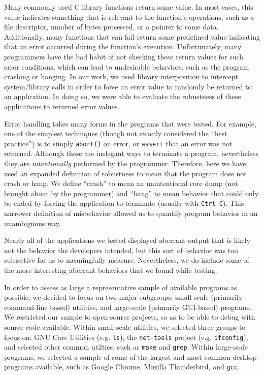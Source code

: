 Many commonly used C library functions return some value. In most cases, this value indicates something that is relevant to the  function's operations, such as a file descriptor, number of bytes processed, or a pointer to some data. Additionally, many functions that can fail return some predefined value indicating that an error occurred during the function's execution. Unfortunately, many programmers have the bad habit of not checking these return values for such error conditions, which can lead to undesirable behaviors, such as the program crashing or hanging. In our work, we used library interposition to intercept system/library calls in order to force an error value to randomly be returned to an application. In doing so, we were able to evaluate the robustness of these applications to returned error values.

Error handling takes many forms in the programs that were tested. For example, one of the simplest techniques (though not exactly considered the ``best practice'') is to simply \texttt{abort()} on error, or \texttt{assert} that an error was not returned. Although these are inelegant ways to terminate a program, nevertheless they are \emph{intentionally} performed by the programmer. Therefore, here we have used an expanded definition of robustness to mean that the program does not crash or hang. We define ``crash'' to mean an unintentional core dump (not brought about by the programmer) and ``hang'' to mean behavior that could only be ended by forcing the application to terminate (usually with \texttt{Ctrl-C}). This narrower definition of misbehavior allowed us to quantify program behavior in an unambiguous way.

Nearly all of the applications we tested displayed aberrant output that is likely not the behavior the developers intended, but this sort of behavior was too subjective for us to meaningfully measure. Nevertheless, we do include some of the more interesting aberrant behaviors that we found while testing.

In order to assess as large a representative sample of available programs as possible, we decided to focus on two major subgroups: small-scale (primarily command-line based) utilities, and large-scale (primarily GUI-based) programs. We restricted our sample to open-source projects, so as to be able to debug with source code available. Within small-scale utilities, we selected three groups to focus on: GNU Core Utilities (e.g. \texttt{ls}), the \texttt{net-tools} project (e.g. \texttt{ifconfig}), and selected other common utilties, such as \texttt{make} and \texttt{grep}. Within large-scale programs, we selected a sample of some of the largest and most common desktop programs available, such as Google Chrome, Mozilla Thunderbird, and \texttt{gcc}.
